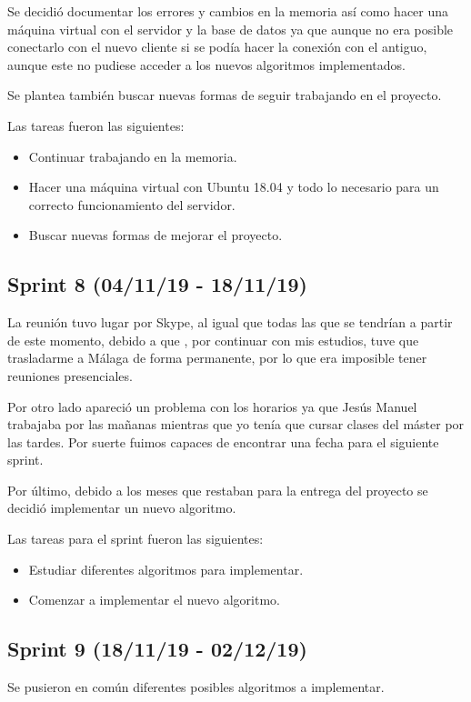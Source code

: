 Se decidió documentar los errores y cambios en la memoria así como hacer una máquina virtual con el servidor y la base de datos ya que aunque no era posible conectarlo con el nuevo cliente si se podía hacer la conexión con el antiguo, aunque este no pudiese acceder a los nuevos algoritmos implementados.

Se plantea también buscar nuevas formas de seguir trabajando en el proyecto.

Las tareas fueron las siguientes:
\begin{itemize}
\item Continuar trabajando en la memoria.
\item Hacer una máquina virtual con Ubuntu 18.04 y todo lo necesario para un correcto funcionamiento del servidor.
\item Buscar nuevas formas de mejorar el proyecto.
\end{itemize}



\subsection{Sprint 8 (04/11/19 - 18/11/19)}
La reunión tuvo lugar por Skype, al igual que todas las que se tendrían a partir de este momento, debido a que , por continuar con mis estudios, tuve que trasladarme a Málaga de forma permanente, por lo que era imposible tener reuniones presenciales.

Por otro lado apareció un problema con los horarios ya que Jesús Manuel trabajaba por las mañanas mientras que yo tenía que cursar clases del máster por las tardes. Por suerte fuimos capaces de encontrar una fecha para el siguiente sprint.

Por último, debido a los meses que restaban para la entrega del proyecto se decidió implementar un nuevo algoritmo.

Las tareas para el sprint fueron las siguientes:
\begin{itemize}
\item Estudiar diferentes algoritmos para implementar.
\item Comenzar a implementar el nuevo algoritmo.
\end{itemize}
\subsection{Sprint 9 (18/11/19 - 02/12/19)}
Se pusieron en común diferentes posibles algoritmos a implementar.

